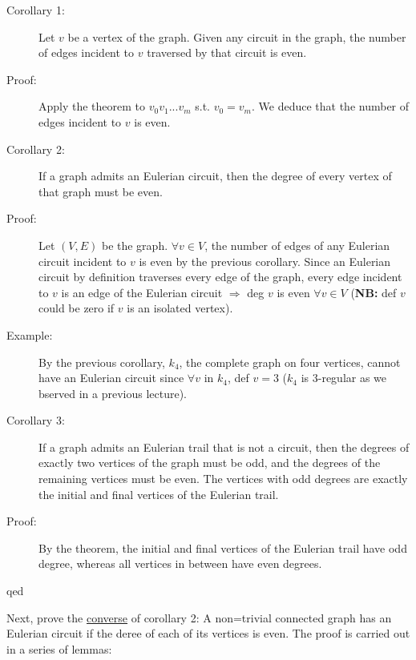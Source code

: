 \documentclass[10pt]{article}
\begin{document}
\begin{description}
		\item[Corollary 1:] Let $v$ be a vertex of the graph. Given any circuit in the graph, the number of edges incident to $v$ traversed by that circuit is even.
		\item[Proof:] Apply the theorem to $v_0 v_1 ... v_m$ s.t. $v_0 = v_m$. We deduce that the number of edges incident to $v$ is even.
		\item[Corollary 2:] If a graph admits an Eulerian circuit, then the degree of every vertex of that graph must be even.
		\item[Proof:] Let $(V, E)$ be the graph. $\forall v \in V$, the number of edges of any Eulerian circuit incident to $v$ is even by the previous corollary. Since an Eulerian circuit by definition traverses every edge of the graph, every edge incident to $v$ is an edge of the Eulerian circuit $\Rightarrow$ deg $v$ is even $\forall v \in V$ (\textbf{NB:} def $v$ could be zero if $v$ is an isolated vertex).
		\item[Example:] By the previous corollary, $k_4$, the complete graph on four vertices, cannot have an Eulerian circuit since $\forall v$ in $k_4$, def $v = 3$ ($k_4$ is 3-regular as we bserved in a previous lecture).
		\item[Corollary 3:] If a graph admits an Eulerian trail that is not a circuit, then the degrees of exactly two vertices of the graph must be odd, and the degrees of the remaining vertices must be even. The vertices with odd degrees are exactly the initial and final vertices of the Eulerian trail.
		\item[Proof:] By the theorem, the initial and final vertices of the Eulerian trail have odd degree, whereas all vertices in between have even degrees.
		\item[qed] 
	\end{description}
	Next, prove the \underline{converse} of corollary 2: A non=trivial connected graph has an Eulerian circuit if the deree of each of its vertices is even. The proof is carried out in a series of lemmas:
\end{document}
